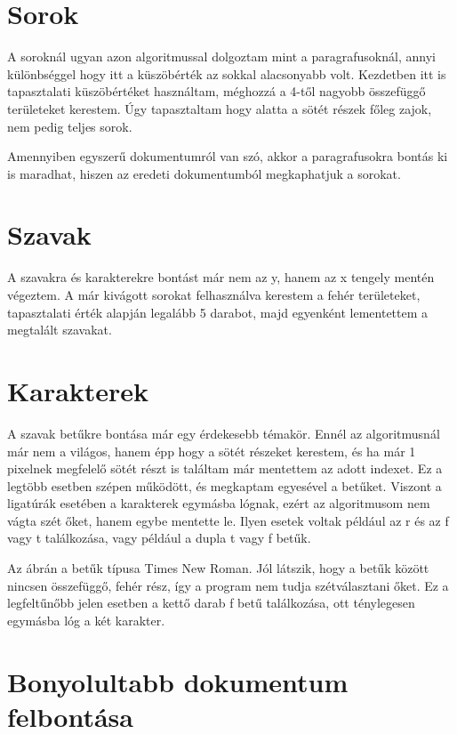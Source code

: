 \documentclass{article}
\begin{document}
\section{Sorok}

A soroknál ugyan azon algoritmussal dolgoztam mint a paragrafusoknál, annyi különbséggel hogy itt a küszöbérték az sokkal alacsonyabb volt. Kezdetben itt is tapasztalati küszöbértéket használtam, méghozzá a 4-től nagyobb összefüggő területeket kerestem. Úgy tapasztaltam hogy alatta a sötét részek főleg zajok, nem pedig teljes sorok.

Amennyiben egyszerű dokumentumról van szó, akkor a paragrafusokra bontás ki is maradhat, hiszen az eredeti dokumentumból megkaphatjuk a sorokat.

\section{Szavak}

A szavakra és karakterekre bontást már nem az y, hanem az x tengely mentén végeztem. A már kivágott sorokat felhasználva kerestem a fehér területeket, tapasztalati érték alapján legalább 5 darabot, majd egyenként lementettem a megtalált szavakat.

\section{Karakterek}

A szavak betűkre bontása már egy érdekesebb témakör. Ennél az algoritmusnál már nem a világos, hanem épp hogy a sötét részeket kerestem, és ha már 1 pixelnek megfelelő sötét részt is találtam már mentettem az adott indexet.
Ez a legtöbb esetben szépen működött, és megkaptam egyesével a betűket.
Viszont a ligatúrák esetében a karakterek egymásba lógnak, ezért az algoritmusom nem vágta szét őket, hanem egybe mentette le.
Ilyen esetek voltak például az r és az f vagy t találkozása, vagy például a dupla t vagy f betűk.

Az ábrán a betűk típusa Times New Roman. Jól látszik, hogy a betűk között nincsen összefüggő, fehér rész, így a program nem tudja szétválasztani őket. Ez a legfeltűnőbb jelen esetben a kettő darab f betű találkozása, ott ténylegesen egymásba lóg a két karakter.

\section{Bonyolultabb dokumentum felbontása}
\end{document}
